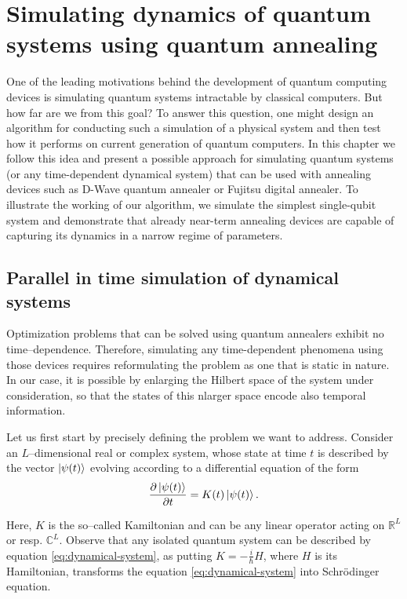 \chapter{Simulating dynamics of quantum systems using quantum annealing}
\label{chapter:simulating}

One of the leading motivations behind the development of quantum computing devices is simulating quantum systems intractable by classical computers. But how far are we from this goal? To answer this question, one might design an algorithm for conducting such a simulation of a physical system and then test how it performs on current generation of quantum computers. In this chapter we follow this idea and present a possible approach for simulating quantum systems (or any time-dependent dynamical system) that can be used with annealing devices such as D-Wave quantum annealer or Fujitsu digital annealer. To illustrate the working of our algorithm, we simulate the simplest single-qubit system and demonstrate that already near-term annealing devices are capable of capturing its dynamics in a narrow regime of parameters.

\section{Parallel in time simulation of dynamical systems}
Optimization problems that can be solved using quantum annealers exhibit no time--dependence. Therefore, simulating any time-dependent phenomena using those devices requires reformulating the problem as one that is static in nature. In our case, it is possible by enlarging the Hilbert space of the system under consideration, so that the states of this nlarger space encode also temporal information.

Let us first start by precisely defining the problem we want to address.
Consider an $L$--dimensional real or complex system, whose state at time $t$
is described by the vector $\ket{\psi(t)}$  evolving according to a differential equation of
the form
\begin{equation}
	\label{eq:dynamical-system}
	\frac{\partial \ket{\psi(t)}}{\partial t} = K(t) \ket{\psi(t)}.
\end{equation}

Here, $K$ is the so--called Kamiltonian and can be any linear operator acting on $\mathbb{R}^L$ or
resp. $\mathbb{C}^L$. Observe that any isolated quantum system can be described by equation
\eqref{eq:dynamical-system}, as putting $K=-\frac{i}{\hbar}H$, where $H$ is its Hamiltonian,
transforms the equation \eqref{eq:dynamical-system} into Schr\"{o}dinger equation.

